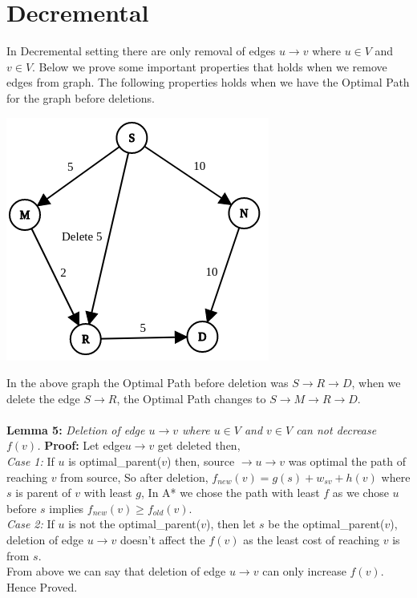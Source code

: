 \documentclass[a4paper]{article}
\begin{document}
\section{Decremental}
In Decremental setting there are only removal of edges $u \rightarrow v$ where $u \in V$ and $v \in V$. Below we prove some important properties that holds when we remove edges from graph. The following properties holds when we have the Optimal Path for the graph before deletions.\\
\begin{center}
\includegraphics[scale=0.4]{img/Delete2.png}    
\end{center}
In the above graph the Optimal Path before deletion was $S \rightarrow R \rightarrow D$, when we delete the edge $S \rightarrow R$, the Optimal Path changes to $S \rightarrow M \rightarrow R \rightarrow D$.\\
\\
\textbf{Lemma 5:} \textit{Deletion of edge $ u \rightarrow v$ where $u \in V$ and $v \in V$ can not decrease $f(v)$.}
\textbf{Proof:} Let edge$ u \rightarrow v$ get deleted then,\\
\textit{Case 1:} If $u$ is optimal\_parent($v$) then, source $\rightarrow u \rightarrow v$ was optimal the path of reaching $v$ from source, So after deletion, $f_{new}(v) = g(s) + w_{sv} + h(v)$ where $s$ is parent of $v$ with least $g$, In A* we chose the path with least $f$ as we chose $u$ before $s$ implies $f_{new}(v) \geq f_{old}(v)$.\\
\textit{Case 2:} If $u$ is  not the optimal\_parent($v$), then let $s$ be the optimal\_parent($v$), deletion of edge $u \rightarrow v$ doesn't affect the $f(v)$ as the least cost of reaching $v$ is from $s$.\\
From above we can say that deletion of edge $u \rightarrow v$ can only increase $f(v)$. Hence Proved.\\
\end{document}
